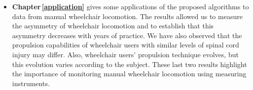 \begin{itemize}
\item \textbf{Chapter\,\ref{application}} gives some applications of the proposed algorithms to data from manual wheelchair locomotion. The results allowed us to measure the asymmetry of wheelchair locomotion and to establish that this asymmetry decreases with years of practice. We have also observed that the propulsion capabilities of wheelchair users with similar levels of spinal cord injury may differ. Also, wheelchair users' propulsion technique evolves, but this evolution varies according to the subject. These last two results highlight the importance of monitoring manual wheelchair locomotion using measuring instruments.  
\end{itemize}


